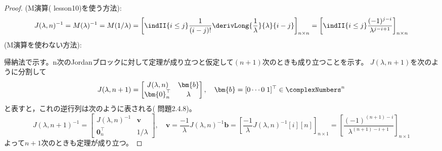                 \begin{proof}
                    \quad\newline
                    (M演算(\cite{現代線形代数入門} lesson10)を使う方法):
                    \[ J(\lambda,n)^{-1} = M(\lambda)^{-1} = M(1/\lambda) = \left[\indII{i\leq j}\frac{1}{(i-j)!}\derivLong{\frac{1}{\lambda}}{\lambda}{i-j}\right]_{n\times n} = \left[\indII{i\leq j}\frac{(-1)^{j-i}}{\lambda^{j-i+1}}\right]_{n\times n} \]
                    \newline
                    (M演算を使わない方法):
                    \par
                    帰納法で示す。n次のJordanブロックに対して定理が成り立つと仮定して$(n+1)$次のときも成り立つことを示す。
                    $J(\lambda,n+1)$を次のように分割して
                    \[
                        J(\lambda,n+1) =
                        \begin{bmatrix}
                            J(\lambda,n) & \bm{b} \\
                            \bm{0}_n^\top & \lambda
                        \end{bmatrix}
                        ,\quad
                        \bm{b} = [0\cdots0\;1]^\top \in \complexNumbers^n
                    \]
                    と表すと，これの逆行列は次のように表される(\cite{入門線形代数} 問題2.4.8)。
                    \[
                        J(\lambda,n+1)^{-1} =
                        \begin{bmatrix}
                            J(\lambda,n)^{-1} & \bm{v} \\
                            \bm{0}_n^\top & 1/\lambda
                        \end{bmatrix}
                        ,\quad
                        \bm{v} = \frac{-1}{\lambda}J(\lambda,n)^{-1}\bm{b} = \left[\frac{-1}{\lambda}J(\lambda,n)^{-1}[i][n]\right]_{n\times 1} = \left[\frac{(-1)^{(n+1)-i}}{\lambda^{(n+1)-i+1}}\right]_{n\times 1}
                    \]
                    よって$n+1$次のときも定理が成り立つ。
                \end{proof}
